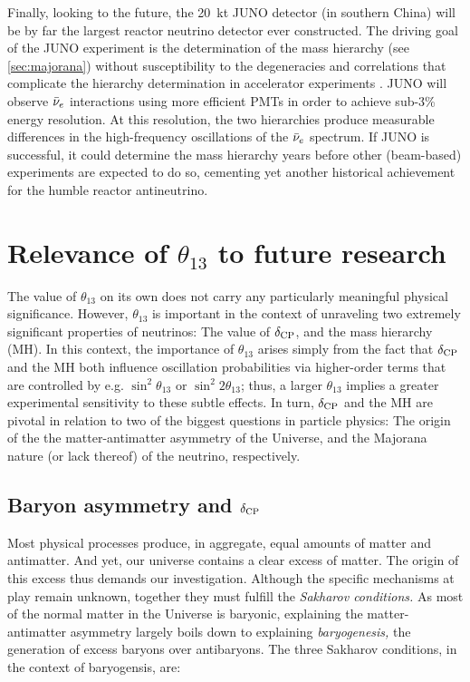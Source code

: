 \documentclass[../thesis.tex]{subfiles}
\begin{document}
Finally, looking to the future, the 20~kt JUNO detector \cite{juno} (in southern China) will be by far the largest reactor neutrino detector ever constructed. The driving goal of the JUNO experiment is the determination of the mass hierarchy (see \autoref{sec:majorana}) without susceptibility to the degeneracies and correlations that complicate the hierarchy determination in accelerator experiments \cite{Ghosh:2017sli}. JUNO will observe $\bar\nu_e$ interactions using more efficient PMTs in order to achieve sub-3\% energy resolution. At this resolution, the two hierarchies produce measurable differences in the high-frequency oscillations of the $\bar\nu_e$ spectrum. If JUNO is successful, it could determine the mass hierarchy years before other (beam-based) experiments are expected to do so, cementing yet another historical achievement for the humble reactor antineutrino.

\section{Relevance of $\theta_{13}$ to future research}
\label{sec:futureRelevance}

The value of $\theta_{13}$ on its own does not carry any particularly meaningful physical significance. However, $\theta_{13}$ is important in the context of unraveling two extremely significant properties of neutrinos: The value of $\delta_\text{CP}$, and the mass hierarchy (MH). In this context, the importance of $\theta_{13}$ arises simply from the fact that $\delta_\text{CP}$ and the MH both influence oscillation probabilities via higher-order terms that are controlled by e.g. \(\sin^2\theta_{13}\) or \(\sin^2 2\theta_{13}\); thus, a larger $\theta_{13}$ implies a greater experimental sensitivity to these subtle effects. In turn, $\delta_\text{CP}$ and the MH are pivotal in relation to two of the biggest questions in particle physics: The origin of the the matter-antimatter asymmetry of the Universe, and the Majorana nature (or lack thereof) of the neutrino, respectively.

\subsection{Baryon asymmetry and $\delta_\text{CP}$}
\label{sec:baryonAsym}

Most physical processes produce, in aggregate, equal amounts of matter and antimatter. And yet, our universe contains a clear excess of matter. The origin of this excess thus demands our investigation. Although the specific mechanisms at play remain unknown, together they must fulfill the \emph{Sakharov conditions.} As most of the normal matter in the Universe is baryonic, explaining the matter-antimatter asymmetry largely boils down to explaining \emph{baryogenesis,} the generation of excess baryons over antibaryons. The three Sakharov conditions, in the context of baryogensis, are:
\end{document}
